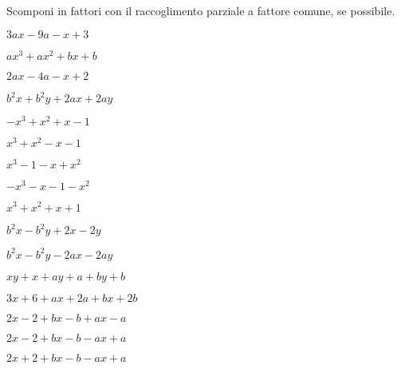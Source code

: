 \begin{esercizio}
\label{ese:div.014}
Scomponi in fattori con il raccoglimento parziale a fattore comune, se possibile.
\begin{multicols}{2}
\begin{enumeratea}
 \item \(3ax-9a-x+3\)
 \item \(ax^{3}+ax^{2}+bx+b\)
 \item \(2ax-4a-x+2\)
 \item \(b^{2}x+b^{2}y+2ax+2ay\)
 \item \(-x^{3}+x^{2}+x-1\)
 \item \(x^{3}+x^{2}-x-1\)
 \item \(x^{3}-1-x+x^{2}\)
 \item \(-x^{3}-x-1-x^{2}\)
 \item \(x^{3}+x^{2}+x+1\)
 \item \(b^{2}x-b^{2}y+2x-2y\)
 \item \(b^{2}x-b^{2}y-2ax-2ay\)
 \item \(xy+x+ay+a+by+b\)
 \item \(3x+6+ax+2a+bx+2b\)
 \item \(2x-2+bx-b+ax-a\)
 \item \(2x-2+bx-b-ax+a\)
 \item \(2x+2+bx-b-ax+a\)
\end{enumeratea}
\end{multicols}
\end{esercizio}
% 

